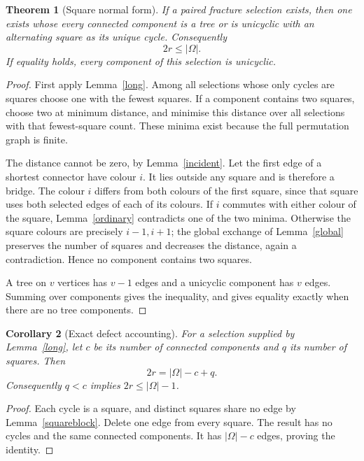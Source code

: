 \documentclass[11pt,a4paper]{article}
\newtheorem{theorem}{Theorem}
\newtheorem{corollary}[theorem]{Corollary}
\begin{document}
\begin{theorem}[Square normal form]\label{normal}
If a paired fracture selection exists, then one exists whose every
connected component is a tree or is unicyclic with an alternating
square as its unique cycle. Consequently
\[
                            2r\leq |\Omega|.
\]
If equality holds, every component of this selection is unicyclic.
\end{theorem}
\begin{proof}
First apply Lemma~\ref{long}. Among all selections whose only cycles
are squares choose one with the fewest squares. If a component
contains two squares, choose two at minimum distance, and minimise
this distance over all selections with that fewest-square count.
These minima exist because the full permutation graph is finite.

The distance cannot be zero, by Lemma~\ref{incident}. Let the first
edge of a shortest connector have colour $i$. It lies outside any
square and is therefore a bridge. The colour $i$ differs from both
colours of the first square, since that square uses both selected
edges of each of its colours. If $i$ commutes with either colour of
the square, Lemma~\ref{ordinary} contradicts one of the two minima.
Otherwise the square colours are precisely $i-1,i+1$; the global
exchange of Lemma~\ref{global} preserves the number of squares and
decreases the distance, again a contradiction. Hence no component
contains two squares.

A tree on $v$ vertices has $v-1$ edges and a unicyclic component has
$v$ edges. Summing over components gives the inequality, and gives
equality exactly when there are no tree components.
\end{proof}

\begin{corollary}[Exact defect accounting]\label{defect}
For a selection supplied by Lemma~\ref{long}, let $c$ be its number of
connected components and $q$ its number of squares. Then
\[
                    2r=|\Omega|-c+q.
\]
Consequently $q<c$ implies $2r\leq |\Omega|-1$.
\end{corollary}
\begin{proof}
Each cycle is a square, and distinct squares share no edge by
Lemma~\ref{squareblock}. Delete one edge from every square. The result
has no cycles and the same connected components. It has
$|\Omega|-c$ edges, proving the identity.
\end{proof}
\end{document}
